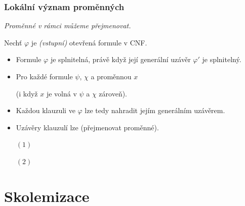     
    
    
    \subsubsection*{Lokální význam proměnných}
    {\it Proměnné v rámci  můžeme přejmenovat.}
    \medskip
    
    Nechť $\varphi$ je \emph{(vstupní)} otevřená formule v CNF.
    
    \begin{itemize}
    \item Formule $\varphi$ je splnitelná, právě když její generální uzávěr $\varphi'$ je splnitelný.
    \smallskip
    
    \item Pro každé formule $\psi$, $\chi$ a proměnnou $x$
    \vspace{-2mm}
    
    \vspace{-6mm}
    (i když $x$ je volná v $\psi$ a $\chi$ zároveň).
    \smallskip
    
    \item Každou klauzuli ve $\varphi$ lze tedy nahradit jejím generálním uzávěrem.
    \smallskip
    
    \item Uzávěry klauzulí lze  (přejmenovat proměnné).
    \end{itemize}
    \medskip
    
    \begin{enumerate}
    \item[$(1)$] 
    \item[$(2)$] 
    \end{enumerate}
    
    


\section{Skolemizace}\todo


